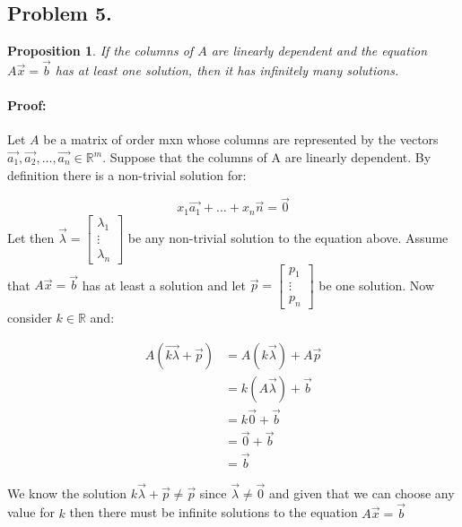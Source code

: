 \documentclass[12pt, letterpaper]{article}
\newcommand{\R}{\mathbb{R}}
\theoremstyle{statement}
\newtheorem*{atmProp}{Proposition}
\newenvironment{atmProof}{\noindent\ignorespaces\paragraph{Proof:}}{\hfill \ding{122}\par\noindent}
\begin{document}
    \subsection*{Problem 5.}
    \begin{atmProp}
    If the columns of $A$ are linearly dependent and the equation $A\vec{x} = \vec{b}$ has at least one solution, then it has infinitely many solutions.
    \end{atmProp}
    \begin{atmProof}
    Let $A$ be a matrix of order mxn whose columns are represented by the vectors $\vec{a_1}, \vec{a_2}, \dots, \vec{a_n} \in \R^m$. Suppose that the columns of A are linearly dependent. By definition there is a non-trivial solution for:
    
    $$x_1\vec{a_1}+\dots+x_n\vec{n}=\vec{0}$$ Let then $\vec{\lambda} = \begin{bmatrix} \lambda_1 \\ \vdots \\ \lambda_n\end{bmatrix}$ be any non-trivial solution to the equation above. Assume that $A\vec{x} = \vec{b}$ has at least a solution and let $\vec{p} = \begin{bmatrix}p_1\\ \vdots \\ p_n \end{bmatrix}$ be one solution. Now consider $k \in \R$ and:
    
    \begin{align*}
        A(\vec{k\lambda} + \vec{p}) & = A(k\vec{\lambda}) + A\vec{p} \\
        & = k(A\vec{\lambda}) + \vec{b} \\
        & = k\vec{0} + \vec{b} \\
        & = \vec{0} + \vec{b} \\
        & = \vec{b}
    \end{align*}
    
    We know the solution $k\vec{\lambda} + \vec{p} \neq \vec{p}$ since $\vec{\lambda} \neq \vec{0}$ and given that we can choose any value for $k$ then there must be infinite solutions to the equation $A\vec{x} = \vec{b}$
    
    \end{atmProof}
    
\end{document}
